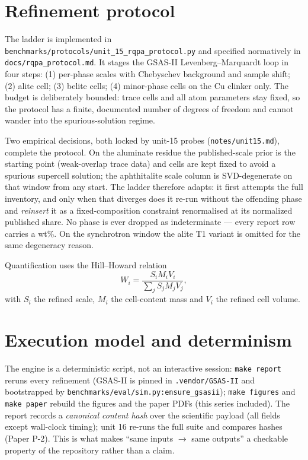 \documentclass[11pt,a4paper]{article}
\begin{document}
\section{Refinement protocol}\label{sec:protocol}
The ladder is implemented in
\texttt{benchmarks/protocols/unit\_15\_rqpa\_protocol.py} and specified
normatively in \texttt{docs/rqpa\_protocol.md}. It stages the GSAS-II
Levenberg--Marquardt loop in four steps: (1) per-phase scales with
Chebyschev background and sample shift; (2) alite cell; (3) belite cells;
(4) minor-phase cells on the Cu clinker only. The budget is deliberately
bounded: trace cells and all atom parameters stay fixed, so the protocol
has a finite, documented number of degrees of freedom and cannot wander
into the spurious-solution regime.

Two empirical decisions, both locked by unit-15 probes
(\texttt{notes/unit15.md}), complete the protocol. On the aluminate
residue the published-scale prior is the starting point (weak-overlap
trace data) and cells are kept fixed to avoid a spurious supercell
solution; the aphthitalite scale column is SVD-degenerate on that window
from any start. The ladder therefore adapts: it first attempts the full
inventory, and only when that diverges does it re-run without the
offending phase and \emph{reinsert} it as a fixed-composition constraint
renormalised at its normalized published share. No phase is ever dropped
as indeterminate --- every report row carries a wt\%. On the synchrotron
window the alite T1 variant is omitted for the same degeneracy reason.

Quantification uses the Hill--Howard relation
\begin{equation}
W_i = \frac{S_i M_i V_i}{\sum_j S_j M_j V_j},
\label{eq:hh}
\end{equation}
with $S_i$ the refined scale, $M_i$ the cell-content mass and $V_i$ the
refined cell volume.

\section{Execution model and determinism}\label{sec:exec}
The engine is a deterministic script, not an interactive session:
\texttt{make report} reruns every refinement (GSAS-II is pinned in
\texttt{.vendor/GSAS-II} and bootstrapped by
\texttt{benchmarks/eval/}\allowbreak\texttt{sim.py:ensure\_gsasii}); \texttt{make figures} and
\texttt{make paper} rebuild the figures and the paper PDFs (this series
included). The report records a \emph{canonical content hash} over the
scientific payload (all fields except wall-clock timing); unit 16
re-runs the full suite and compares hashes (Paper P-2). This is what
makes ``same inputs $\to$ same outputs'' a checkable property of the
repository rather than a claim.
\end{document}
